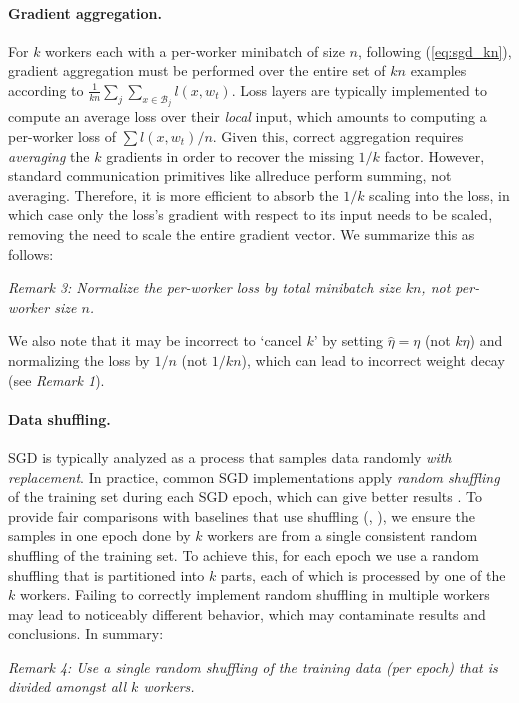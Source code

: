 \documentclass[10pt,twocolumn,letterpaper]{article}
\def\B{\mathcal{B}}
\begin{document}
\paragraph{Gradient aggregation.} For $k$ workers each with a per-worker minibatch of size $n$, following (\ref{eq:sgd_kn}), gradient aggregation must be performed over the entire set of $kn$ examples according to $\frac{1}{kn}\sum_j\sum_{x\in\B_j} l(x,w_t)$. Loss layers are typically implemented to compute an average loss over their \emph{local} input, which amounts to computing a per-worker loss of $\sum l(x,w_t)/n$. Given this, correct aggregation requires \emph{averaging} the $k$ gradients in order to recover the missing $1/k$ factor. However, standard communication primitives like allreduce \cite{gropp1999} perform summing, not averaging. Therefore, it is more efficient to absorb the $1/k$ scaling into the loss, in which case only the loss's gradient with respect to its input needs to be scaled, removing the need to scale the entire gradient vector. We summarize this as follows:
\begin{center}\begin{minipage}{.8\linewidth}\centering
 \emph{Remark 3: Normalize the per-worker loss by \emph{total} minibatch size $kn$, \emph{not} per-worker size $n$.}
\end{minipage}\end{center}
We also note that it may be incorrect to `cancel $k$' by setting $\hat \eta = \eta$ (not $k\eta$) and normalizing the loss by $1/n$ (not $1/kn$), which can lead to incorrect weight decay (see \emph{Remark 1}).

\paragraph{Data shuffling.} SGD is typically analyzed as a process that samples data randomly \emph{with replacement}. In practice, common SGD implementations apply \emph{random shuffling} of the training set during each SGD epoch, which can give better results \cite{bottou2009, gurbuzbalaban2015}. To provide fair comparisons with baselines that use shuffling (\eg, \cite{He2016}), we ensure the samples in one epoch done by $k$ workers are from a single consistent random shuffling of the training set. To achieve this, for each epoch we use a random shuffling that is partitioned into $k$ parts, each of which is processed by one of the $k$ workers. Failing to correctly implement random shuffling in multiple workers may lead to noticeably different behavior, which may contaminate results and conclusions. In summary:
\begin{center}\begin{minipage}{.94\linewidth}\centering
 \emph{Remark 4: Use a single random shuffling of the training data (per epoch) that is divided amongst all $k$ workers.}
\end{minipage}\end{center}
\end{document}
